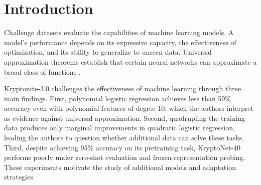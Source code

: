 \documentclass{article}
\begin{document}
\setcounter{dbltopnumber}{1}
\raggedbottom
{}
\printAffiliationsAndNotice{}

\begin{abstract}
Kryptonite-3.0 uses the failure of selected classifiers and frozen pretrained representations to argue that its tasks resist modern machine learning. We revisit this conclusion with sign-transformed CatBoost, scratch MLPs, matched learning curves, and low-rank adaptation (LoRA) of KryptoNet-40. After local validation-based selection and refitting on 90\% of the labelled data, sign-CatBoost achieves 93.44--96.28\% mean local-test accuracy on Kryptonite-20, -30 and -40, compared with 53.41--54.50\% for quadratic logistic regression. Increasing the matched training subsets fourfold improves CatBoost validation accuracy by 5.89--13.32 percentage points, whereas quadratic logistic regression gains at most 2.46 points. On Kryptonite-40-Adapt, validation-selected rank-1 LoRA reaches 95.75\% mean local-test accuracy while training 0.51\% of the network's parameters. These results challenge the mock paper's general inference for the evaluated methods; they do not establish performance on the hidden sets.
\end{abstract}

\section{Introduction}
Challenge datasets evaluate the capabilities of machine learning models. A model's performance depends on its expressive capacity, the effectiveness of optimization, and its ability to generalize to unseen data. Universal approximation theorems establish that certain neural networks can approximate a broad class of functions \cite{leshno1993}.

Kryptonite-3.0 \cite{quinn2026} challenges the effectiveness of machine learning through three main findings. First, polynomial logistic regression achieves less than 59\% accuracy even with polynomial features of degree 10, which the authors interpret as evidence against universal approximation. Second, quadrupling the training data produces only marginal improvements in quadratic logistic regression, leading the authors to question whether additional data can solve these tasks. Third, despite achieving 95\% accuracy on its pretraining task, KryptoNet-40 performs poorly under zero-shot evaluation and frozen-representation probing. These experiments motivate the study of additional models and adaptation strategies.
\end{document}
